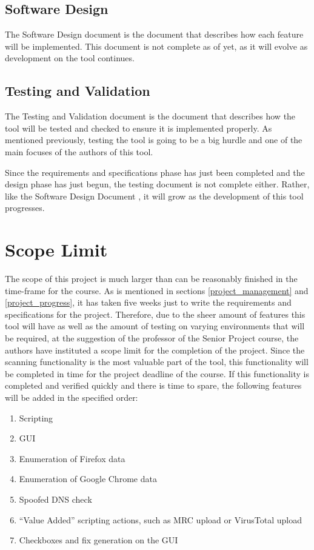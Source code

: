 \documentclass[letterpaper,12pt]{article}
\begin{document}
\subsection{Software Design}
\label{software_design}
The Software Design document \cite{Design} is the document that describes how
each feature will be implemented.  This document is not complete as of yet, as
it will evolve as development on the tool continues.  

\subsection{Testing and Validation}
\label{testing_and_evaluation}
The Testing and Validation document \cite{Testing} is the document that
describes how the tool will be tested and checked to ensure it is implemented
properly.  As mentioned previously, testing the tool is going to be a big hurdle
and one of the main focuses of the authors of this tool.  

Since the requirements and specifications phase has just been completed and the
design phase has just begun, the testing document is not complete either. 
Rather, like the Software Design Document \cite{Design}, it will grow as the
development of this tool progresses.  

\newpage



\section{Scope Limit} \label{scope_limit}
The scope of this project is much larger than can be reasonably finished in the
time-frame for the course.  As is mentioned in sections 
\ref{project_management} and \ref{project_progress}, it has taken five weeks
just to write the requirements and specifications for the project.  Therefore,
due to the sheer amount of features this tool will have as well as the amount of
testing on varying environments that will be required, at the suggestion of the
professor of the Senior Project course, the authors have instituted a scope
limit for the completion of the project.  Since the scanning functionality is
the most valuable part of the tool, this functionality will be completed in time
for the project deadline of the course.  If this functionality is completed and
verified quickly and there is time to spare, the following features will be
added in the specified order:

\begin{enumerate}
    \item Scripting 
    \item GUI 
    \item Enumeration of Firefox data
    \item Enumeration of Google Chrome data
    \item Spoofed DNS check
    \item ``Value Added'' scripting actions, such as MRC upload or VirusTotal
    upload
    \item Checkboxes and fix generation on the GUI
\end{enumerate}
\end{document}
